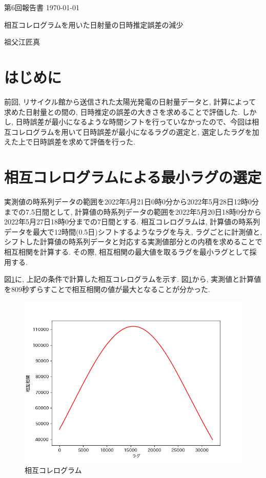 \documentclass[a4j,12pt,]{jarticle}
\begin{document}
{\noindent\small 第6回報告書 \hfill\today}
\begin{center}
  {\Large 相互コレログラムを用いた日射量の日時推定誤差の減少}
\end{center}
\begin{flushright}
  祖父江匠真 \\
\end{flushright}

\section{はじめに}
前回, リサイクル館から送信された太陽光発電の日射量データと, 計算によって求めた日射量との間の, 日時推定の誤差の大きさを求めることで評価した.
しかし, 日時誤差が最小になるような時間シフトを行っていなかったので、今回は相互コレログラムを用いて日時誤差が最小になるラグの選定と, 選定したラグを加えた上で日時誤差を求めて評価を行った.

\section{相互コレログラムによる最小ラグの選定}
実測値の時系列データの範囲を2022年5月21日0時0分から2022年5月28日12時0分までの7.5日間として, 計算値の時系列データの範囲を2022年5月20日18時0分から2022年5月27日18時0分までの7日間とする.
相互コレログラムは, 計算値の時系列データを最大で12時間(0.5日)シフトするようなラグを与え, ラグごとに計測値と, シフトした計算値の時系列データと対応する実測値部分との内積を求めることで相互相関を計算する.
その際, 相互相関の最大値を取るラグを最小ラグとして採用する.

図\ref{p1}に, 上記の条件で計算した相互コレログラムを示す.
図\ref{p1}から, 実測値と計算値を809秒ずらすことで相互相関の値が最大となることが分かった.

\begin{figure}[H]
  \begin{center}
    \includegraphics[width=160mm]{correlogram.png}
    \caption{相互コレログラム}
    \label{p1}
  \end{center}
\end{figure}
\end{document}
